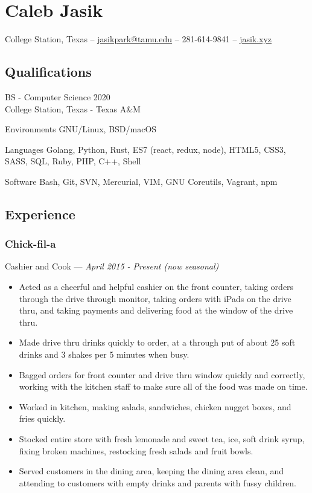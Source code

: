 \documentclass[letterpaper,10pt]{article}
\begin{document}
\section{Caleb Jasik}

\hfill College Station, Texas --
\href{mailto:jasikpark@tamu.edu}{jasikpark@tamu.edu} --
281-614-9841 --
\href{https://jasik.xyz}{jasik.xyz}

\subsection{Qualifications}

BS - Computer Science 2020\\
College Station, Texas - Texas A\&M

\begin{skills}
\item[Environments]
  GNU/Linux, BSD/macOS
\item[Languages]
  Golang, Python, Rust, ES7 (react, redux, node), HTML5, CSS3, SASS, SQL,
  Ruby, PHP, C++, Shell
\item[Software]
  Bash, Git, SVN, Mercurial, VIM, GNU Coreutils, Vagrant, npm
\end{skills}

\subsection{Experience}

\subsubsection{Chick-fil-a}
\hfill Cashier and Cook --- \emph{April 2015 - Present (now seasonal)}

\begin{itemize}
\tightlist{}
\item
	Acted as a cheerful and helpful cashier on the front counter, taking orders through the drive through monitor, taking orders with iPads on the drive thru, and taking payments and delivering food at the window of the drive thru.
\item
	Made drive thru drinks quickly to order, at a through put of about 25 soft drinks and 3 shakes per 5 minutes when busy.
\item
	Bagged orders for front counter and drive thru window quickly and correctly, working with the kitchen staff to make sure all of the food was made on time.
\item
	Worked in kitchen, making salads, sandwiches, chicken nugget boxes, and fries quickly.
\item
	Stocked entire store with fresh lemonade and sweet tea, ice, soft drink syrup, fixing broken machines, restocking fresh salads and fruit bowls.
\item
	Served customers in the dining area, keeping the dining area clean, and attending to customers with empty drinks and parents with fussy children.
\end{itemize}
\end{document}
